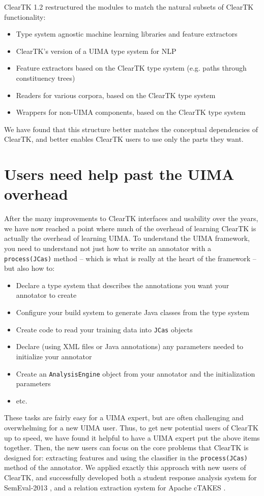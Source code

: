 \documentclass[10pt, a4paper]{article}
\newcommand{\code}[1]{\texttt{\small #1}}
\begin{document}
ClearTK 1.2 restructured the modules to match the natural subsets of ClearTK functionality:
\begin{itemize}
\item Type system agnostic machine learning libraries and feature extractors 
\item ClearTK's version of a UIMA type system for NLP
\item Feature extractors based on the ClearTK type system (e.g. paths through constituency trees)
\item Readers for various corpora, based on the ClearTK type system
\item Wrappers for non-UIMA components, based on the ClearTK type system
\end{itemize}
We have found that this structure better matches the conceptual dependencies of ClearTK, and better enables ClearTK users to use only the parts they want.


\section{Users need help past the UIMA overhead}
After the many improvements to ClearTK interfaces and usability over the years, we have now reached a point where much of the overhead of learning ClearTK is actually the overhead of learning UIMA.
To understand the UIMA framework, you need to understand not just how to write an annotator with a \code{process(JCas)} method -- which is what is really at the heart of the framework -- but also how to:
\begin{itemize}
\item Declare a type system that describes the annotations you want your annotator to create
\item Configure your build system to generate Java classes from the type system
\item Create code to read your training data into \code{JCas} objects
\item Declare (using XML files or Java annotations) any parameters needed to initialize your annotator
\item Create an \code{AnalysisEngine} object from your annotator and the initialization parameters
\item etc.
\end{itemize}
These tasks are fairly easy for a UIMA expert, but are often challenging and overwhelming for a new UIMA user.
Thus, to get new potential users of ClearTK up to speed, we have found it helpful to have a UIMA expert put the above items together.
Then, the new users can focus on the core problems that ClearTK is designed for: extracting features and using the classifier in the \code{process(JCas)} method of the annotator.
We applied exactly this approach with new users of ClearTK, and successfully developed both a student response analysis system for SemEval-2013 \cite{okoye-bethard-sumner:2013:SemEval-2013}, and a relation extraction system for Apache cTAKES \cite{dligach2013discovering}.
\end{document}
